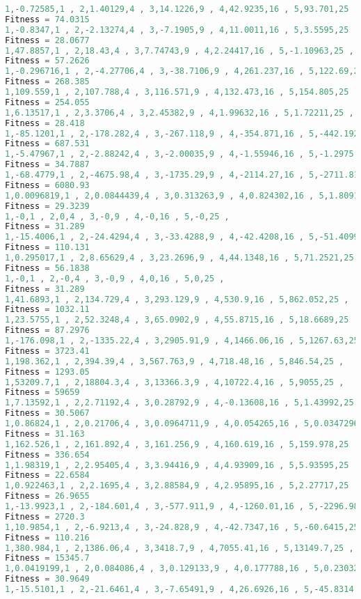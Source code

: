 \documentclass[10pt,b5paper]{article}
\begin{document}
\begin{lstlisting}[language=c++]
1,-0.72585,1 , 2,1.40129,4 , 3,14.1226,9 , 4,42.9235,16 , 5,93.701,25 , 
Fitness = 74.0315
1,-0.8347,1 , 2,-2.13274,4 , 3,-7.1905,9 , 4,11.0011,16 , 5,3.5595,25 , 
Fitness = 28.0677
1,47.8857,1 , 2,18.43,4 , 3,7.74743,9 , 4,2.24417,16 , 5,-1.10963,25 , 
Fitness = 57.2626
1,-0.296716,1 , 2,-4.27706,4 , 3,-38.7106,9 , 4,261.237,16 , 5,122.69,25 , 
Fitness = 268.385
1,109.559,1 , 2,107.788,4 , 3,116.571,9 , 4,132.473,16 , 5,154.805,25 , 
Fitness = 254.055
1,6.13517,1 , 2,3.3706,4 , 3,2.45382,9 , 4,1.99632,16 , 5,1.72211,25 , 
Fitness = 28.418
1,-85.1201,1 , 2,-178.282,4 , 3,-267.118,9 , 4,-354.871,16 , 5,-442.192,25 , 
Fitness = 687.531
1,-5.47967,1 , 2,-2.88242,4 , 3,-2.00035,9 , 4,-1.55946,16 , 5,-1.2975,25 , 
Fitness = 34.7887
1,-68.4779,1 , 2,-4675.98,4 , 3,-1735.29,9 , 4,-2114.27,16 , 5,-2711.81,25 , 
Fitness = 6080.93
1,0.0096819,1 , 2,0.0844439,4 , 3,0.313263,9 , 4,0.824302,16 , 5,1.80914,25 , 
Fitness = 29.3239
1,-0,1 , 2,0,4 , 3,-0,9 , 4,-0,16 , 5,-0,25 , 
Fitness = 31.289
1,-15.4006,1 , 2,-24.4294,4 , 3,-33.4288,9 , 4,-42.4208,16 , 5,-51.4099,25 , 
Fitness = 110.131
1,0.295017,1 , 2,8.65629,4 , 3,23.2696,9 , 4,44.1348,16 , 5,71.2521,25 , 
Fitness = 56.1838
1,-0,1 , 2,-0,4 , 3,-0,9 , 4,0,16 , 5,0,25 , 
Fitness = 31.289
1,41.6893,1 , 2,134.729,4 , 3,293.129,9 , 4,530.9,16 , 5,862.052,25 , 
Fitness = 1032.11
1,23.5755,1 , 2,52.3248,4 , 3,65.0902,9 , 4,55.8715,16 , 5,18.6689,25 , 
Fitness = 87.2976
1,-176.098,1 , 2,-1335.22,4 , 3,2905.91,9 , 4,1466.06,16 , 5,1267.63,25 , 
Fitness = 3723.41
1,198.362,1 , 2,394.39,4 , 3,567.763,9 , 4,718.48,16 , 5,846.54,25 , 
Fitness = 1293.05
1,53209.7,1 , 2,18804.3,4 , 3,13366.3,9 , 4,10722.4,16 , 5,9055,25 , 
Fitness = 59659
1,7.13592,1 , 2,2.71192,4 , 3,0.28792,9 , 4,-0.13608,16 , 5,1.43992,25 , 
Fitness = 30.5067
1,0.86824,1 , 2,0.21706,4 , 3,0.0964711,9 , 4,0.054265,16 , 5,0.0347296,25 , 
Fitness = 31.163
1,162.526,1 , 2,161.892,4 , 3,161.256,9 , 4,160.619,16 , 5,159.978,25 , 
Fitness = 336.654
1,1.98319,1 , 2,2.95405,4 , 3,3.94416,9 , 4,4.93909,16 , 5,5.93595,25 , 
Fitness = 22.6584
1,0.922463,1 , 2,2.1695,4 , 3,2.88584,9 , 4,2.95895,16 , 5,2.27717,25 , 
Fitness = 26.9655
1,-13.9923,1 , 2,-184.601,4 , 3,-577.911,9 , 4,-1260.01,16 , 5,-2296.98,25 , 
Fitness = 2720.3
1,10.9854,1 , 2,-6.9213,4 , 3,-24.828,9 , 4,-42.7347,16 , 5,-60.6415,25 , 
Fitness = 110.216
1,380.984,1 , 2,1386.06,4 , 3,3418.7,9 , 4,7055.41,16 , 5,13149.7,25 , 
Fitness = 15345.7
1,0.0419199,1 , 2,0.084086,4 , 3,0.129133,9 , 4,0.177788,16 , 5,0.230329,25 , 
Fitness = 30.9649
1,-15.5101,1 , 2,-21.6461,4 , 3,-7.65491,9 , 4,26.6926,16 , 5,-45.8314,25 , 

\end{lstlisting}
\end{document}
